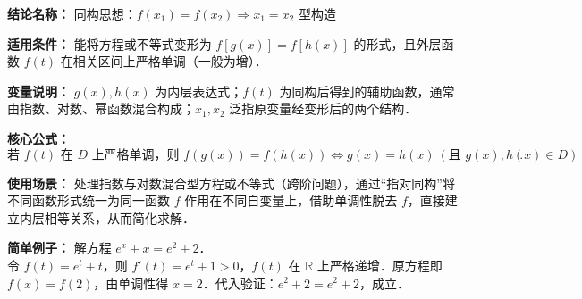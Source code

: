 \textbf{结论名称：} 同构思想：$f(x_1)=f(x_2)\Rightarrow x_1=x_2$ 型构造

\textbf{适用条件：} 能将方程或不等式变形为 $f[g(x)]=f[h(x)]$ 的形式，且外层函数 $f(t)$ 在相关区间上严格单调（一般为增）．

\textbf{变量说明：} $g(x),h(x)$ 为内层表达式；$f(t)$ 为同构后得到的辅助函数，通常由指数、对数、幂函数混合构成；$x_1,x_2$ 泛指原变量经变形后的两个结构．

\textbf{核心公式：}
\[
\boxed{\text{若 } f(t) \text{ 在 } D \text{ 上严格单调，则 } f(g(x))=f(h(x)) \iff g(x)=h(x)\ (\text{且 } g(x),h(x)\in D)} .
\]

\textbf{使用场景：} 处理指数与对数混合型方程或不等式（跨阶问题），通过“指对同构”将不同函数形式统一为同一函数 $f$ 作用在不同自变量上，借助单调性脱去 $f$，直接建立内层相等关系，从而简化求解．

\textbf{简单例子：} 解方程 $e^x+x = e^2+2$．\\
令 $f(t)=e^t+t$，则 $f'(t)=e^t+1>0$，$f(t)$ 在 $\mathbb{R}$ 上严格递增．原方程即 $f(x)=f(2)$，由单调性得 $x=2$．代入验证：$e^2+2=e^2+2$，成立．